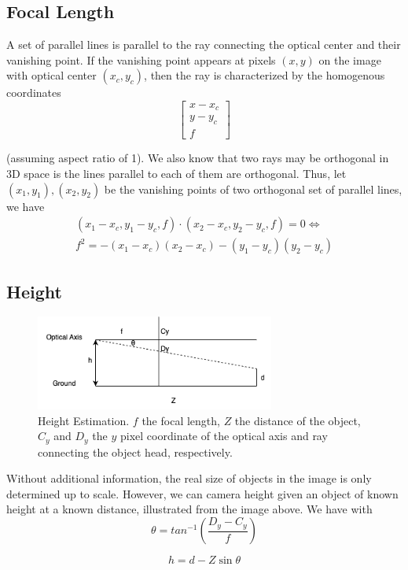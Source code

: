 \documentclass{article}
\begin{document}
\subsection{Focal Length}
A set of parallel lines is parallel to the ray connecting the optical center and their vanishing point. 
If the vanishing point appears at pixels $(x, y)$ on the image with optical center $(x_c, y_c)$, then 
the ray is characterized by the homogenous coordinates
$$ 
\begin{bmatrix}
    x - x_c \\
    y - y_c \\ 
    f
\end{bmatrix}
$$

(assuming aspect ratio of 1). 
We also know that two rays may be orthogonal in 3D space is the lines parallel to each of them are orthogonal. 
Thus, let $(x_1, y_1), (x_2, y_2)$ be the vanishing points of two orthogonal set of parallel lines, 
we have 
\begin{align*}
    (x_1 - x_c, y_1 - y_c, f) \cdot (x_2 - x_c, y_2 - y_c, f) = 0 \Leftrightarrow\\
    f^2 = -(x_1 - x_c)(x_2 - x_c) - (y_1 - y_c)(y_2 - y_c)
\end{align*}

\subsection{Height}

\begin{figure}[h]
    \centering
    \includegraphics[width=0.7\textwidth]{height-estimation.drawio.png} %
    \caption{Height Estimation. $f$ the focal length, $Z$ the distance of the object,
    $C_y$ and $D_y$ the $y$ pixel coordinate of the optical axis and ray connecting the object head, respectively.}
    \label{fig:example}
\end{figure}

Without additional information, the real size of objects in the image is only determined up to scale. However, we can camera height given an object of 
known height at a known distance, illustrated from the image above. 
We have 
with 
$$
\theta = tan^{-1}(\frac{D_y - C_y}{f})
$$

$$
h = d - Z \sin \theta
$$
\end{document}
